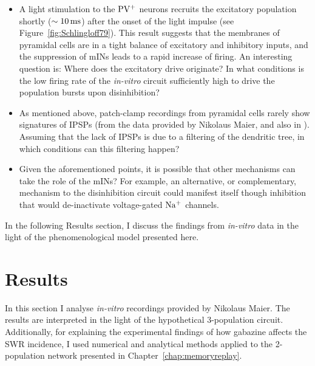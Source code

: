     \begin{itemize}
      \item A light stimulation to the $\rm PV^+$ neurons recruits the
        excitatory population shortly ($\sim 10\, \rm ms$) after the onset of
        the light impulse (see Figure~\ref{fig:Schlingloff79}). This result
        suggests that the membranes of pyramidal cells are in a tight balance
        of excitatory and inhibitory inputs, and the suppression of mINs leads
        to a rapid increase of firing. An interesting question is: Where does
        the excitatory drive originate? In what conditions is the low firing
        rate of the \textit{in-vitro} circuit sufficiently high to drive the
        population bursts upon disinhibition?
      \item As mentioned above, patch-clamp recordings from pyramidal cells
        rarely show signatures of IPSPs (from the data provided by Nikolaus
        Maier, and also in \cite{Maier2011, Schlingloff2014}). Assuming that
        the lack of IPSPs is due to a filtering of the dendritic tree, in which
        conditions can this filtering happen?
      \item Given the aforementioned points, it is possible that other
        mechanisms can take the role of the mINs? For example, an alternative,
        or complementary, mechanism to the disinhibition circuit could manifest
        itself though inhibition that would de-inactivate voltage-gated $\rm
        Na^+$ channels.
    \end{itemize}

    In the following Results section, I discuss the findings from \textit{in-vitro} data 
    in the light of the phenomenological model presented here. 

\section{Results}
  In this section I analyse \textit{in-vitro} recordings provided
  by Nikolaus Maier. The results are interpreted in the light of the
  hypothetical 3-population circuit. Additionally, for explaining the
  experimental findings of how gabazine affects the SWR incidence, I used
  numerical and analytical methods applied to the 2-population network
  presented in Chapter~\ref{chap:memoryreplay}.
 
